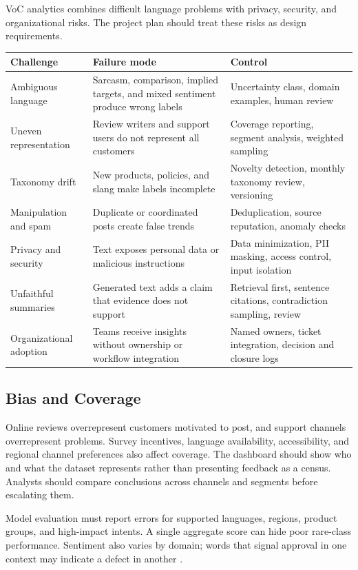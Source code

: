 \documentclass[11pt,a4paper,twoside]{article}
\begin{document}
VoC analytics combines difficult language problems with privacy, security, and organizational risks. The project plan should treat these risks as design requirements.

\begin{tabularx}{\textwidth}{|>{\raggedright\arraybackslash}p{3.05cm}|Y|Y|}
\hline
\textbf{Challenge} & \textbf{Failure mode} & \textbf{Control} \\ \hline
Ambiguous language & Sarcasm, comparison, implied targets, and mixed sentiment produce wrong labels & Uncertainty class, domain examples, human review \\ \hline
Uneven representation & Review writers and support users do not represent all customers & Coverage reporting, segment analysis, weighted sampling \\ \hline
Taxonomy drift & New products, policies, and slang make labels incomplete & Novelty detection, monthly taxonomy review, versioning \\ \hline
Manipulation and spam & Duplicate or coordinated posts create false trends & Deduplication, source reputation, anomaly checks \\ \hline
Privacy and security & Text exposes personal data or malicious instructions & Data minimization, PII masking, access control, input isolation \\ \hline
Unfaithful summaries & Generated text adds a claim that evidence does not support & Retrieval first, sentence citations, contradiction sampling, review \\ \hline
Organizational adoption & Teams receive insights without ownership or workflow integration & Named owners, ticket integration, decision and closure logs \\ \hline
\end{tabularx}

\subsection{Bias and Coverage}

Online reviews overrepresent customers motivated to post, and support channels overrepresent problems. Survey incentives, language availability, accessibility, and regional channel preferences also affect coverage. The dashboard should show who and what the dataset represents rather than presenting feedback as a census. Analysts should compare conclusions across channels and segments before escalating them.

Model evaluation must report errors for supported languages, regions, product groups, and high-impact intents. A single aggregate score can hide poor rare-class performance. Sentiment also varies by domain; words that signal approval in one context may indicate a defect in another \cite{liu2012}.
\end{document}
